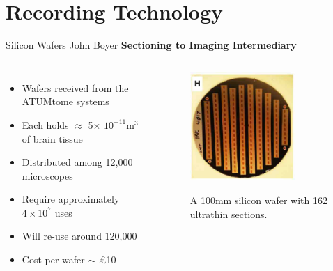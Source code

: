 \documentclass[10pt]{beamer}
\begin{document}
\section{Recording Technology}

\begin{frame}{Silicon Wafers \hspace{0pt plus 1 filll} \small{John Boyer}}
	\textbf{Sectioning to Imaging Intermediary}
	\begin{columns}[T,onlytextwidth]
		\begin{itemize}[label={$\bullet$}]
			\vspace{1cm}
			\item Wafers received from the ATUMtome systems
			
			\item Each holds $\approx$ 5$\times$ $10^{-11} \text{m} ^3$ of brain tissue \cite{hayworth2014atum}
			
			\item Distributed among 12,000 microscopes
			
			\item Require approximately $4\times10^7$ uses
			\vspace{0.5cm}
			
			\item Will re-use around 120,000 
			\item Cost per wafer $\sim$ \pounds10 \cite{WaferPrice}
			
			
		\end{itemize}
		\begin{figure}
			\centering
			\includegraphics[totalheight=4cm,width=4cm]{silicon_wafer}
			\caption \small A 100mm silicon wafer with 162 ultrathin sections.\cite{hayworth2014atum}
		\end{figure}
	\end{columns}
\end{frame}
\end{document}
